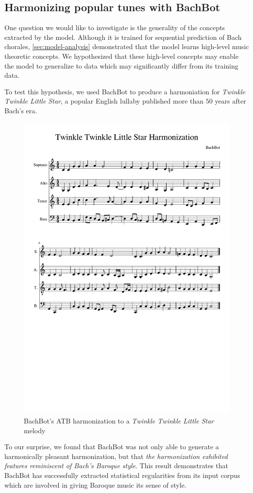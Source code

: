 \subsection{Harmonizing popular tunes with BachBot}

One question we would like to investigate is the generality of the concepts
extracted by the model. Although it is trained for sequential prediction of
Bach chorales, \cref{sec:model-analysis} demonstrated that the model learns
high-level music theoretic concepts. We hypothesized that these high-level
concepts may enable the model to generalize to data which may significantly
differ from its training data.

To test this hypothesis, we used BachBot to produce a harmoniation for
\textit{Twinkle Twinkle Little Star}, a popular English lullaby published
more than $50$ years after Bach's era.

\begin{figure}[tb]
  \centering
  \includegraphics[trim={0 10cm 0 3.7cm},clip,width=0.9\linewidth]{twinkle-twinkle-score.pdf}
  \caption{BachBot's ATB harmonization to a \textit{Twinkle Twinkle Little Star} melody}
  \label{fig:harm-twinkle-twinkle}
\end{figure}

To our surprise, we found that BachBot was not only able to generate a
harmonically pleasant harmonization, but that \emph{the harmonization exhibited
features reminiscent of Bach's Baroque style}. This result demonstrates that
BachBot has successfully extracted statistical regularities from its input
corpus which are involved in giving Baroque music its sense of style.

